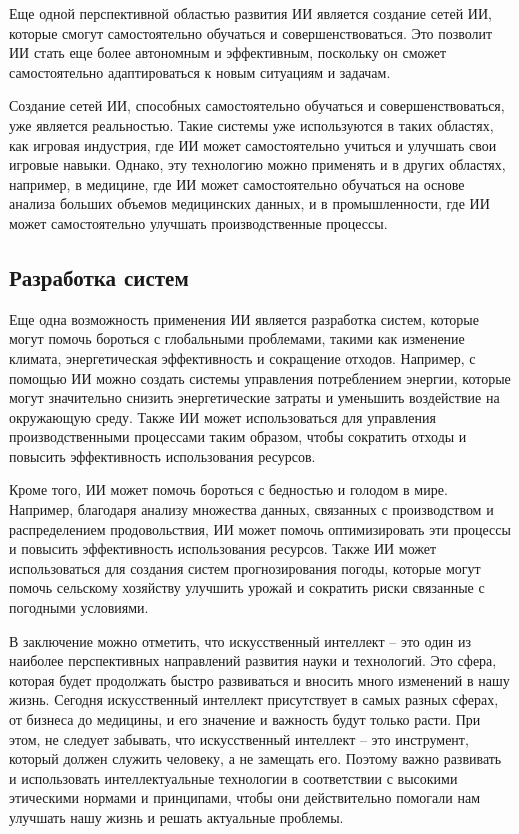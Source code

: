 \documentclass[bachelor,och,referat]{SCWorks_corrected}
\begin{document}
Еще одной перспективной областью развития ИИ является создание сетей ИИ, которые смогут самостоятельно обучаться и совершенствоваться. Это позволит ИИ стать еще более автономным и эффективным, поскольку он сможет самостоятельно адаптироваться к новым ситуациям и задачам.

Создание сетей ИИ, способных самостоятельно обучаться и совершенствоваться, уже является реальностью. Такие системы уже используются в таких областях, как игровая индустрия, где ИИ может самостоятельно учиться и улучшать свои игровые навыки. Однако, эту технологию можно применять и в других областях, например, в медицине, где ИИ может самостоятельно обучаться на основе анализа больших объемов медицинских данных, и в промышленности, где ИИ может самостоятельно улучшать производственные процессы.

\subsection{Разработка систем}

Еще одна возможность применения ИИ является разработка систем, которые могут помочь бороться с глобальными проблемами, такими как изменение климата, энергетическая эффективность и сокращение отходов. Например, с помощью ИИ можно создать системы управления потреблением энергии, которые могут значительно снизить энергетические затраты и уменьшить воздействие на окружающую среду. Также ИИ может использоваться для управления производственными процессами таким образом, чтобы сократить отходы и повысить эффективность использования ресурсов.

Кроме того, ИИ может помочь бороться с бедностью и голодом в мире. Например, благодаря анализу множества данных, связанных с производством и распределением продовольствия, ИИ может помочь оптимизировать эти процессы и повысить эффективность использования ресурсов. Также ИИ может использоваться для создания систем прогнозирования погоды, которые могут помочь сельскому хозяйству улучшить урожай и сократить риски связанные с погодными условиями.

\conclusion

В заключение можно отметить, что искусственный интеллект – это один из наиболее перспективных направлений развития науки и технологий. Это сфера, которая будет продолжать быстро развиваться и вносить много изменений в нашу жизнь. Сегодня искусственный интеллект присутствует в самых разных сферах, от бизнеса до медицины, и его значение и важность будут только расти. При этом, не следует забывать, что искусственный интеллект – это инструмент, который должен служить человеку, а не замещать его. Поэтому важно развивать и использовать интеллектуальные технологии в соответствии с высокими этическими нормами и принципами, чтобы они действительно помогали нам улучшать нашу жизнь и решать актуальные проблемы.



\end{document}
